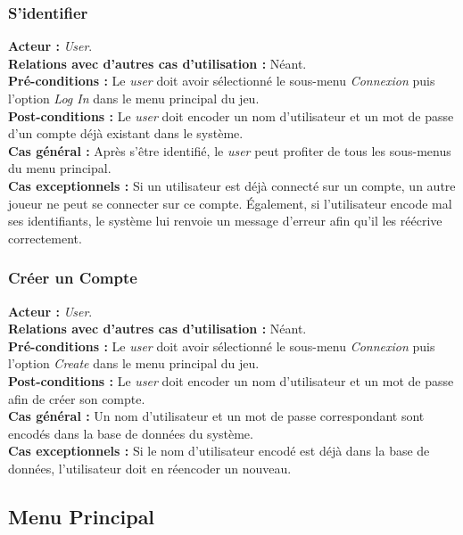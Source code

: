 \documentclass[10pt, a4paper]{article}
\begin{document}
\subsubsection{S'identifier}
\textbf{Acteur :} \textit{User}.\\
\textbf{Relations avec d'autres cas d'utilisation :} Néant.\\
\textbf{Pré-conditions :} Le \textit{user} doit avoir sélectionné le sous-menu \textit{Connexion} puis l'option {\itshape Log In} dans le menu principal du jeu.\\
\textbf{Post-conditions :} Le \textit{user} doit encoder un nom d'utilisateur et un mot de passe d'un compte déjà existant dans le système. \\
\textbf{Cas général :} Après s'être identifié, le \textit{user} peut profiter de tous les sous-menus du menu principal.\\
\textbf{Cas exceptionnels :} Si un utilisateur est déjà connecté sur un compte, un autre joueur ne peut se connecter sur ce compte. Également, si l'utilisateur encode mal ses identifiants, le système lui renvoie un message d'erreur afin qu'il les réécrive correctement.



\subsubsection{Créer un Compte}
\textbf{Acteur :} \textit{User}.\\
\textbf{Relations avec d'autres cas d'utilisation :} Néant.\\
\textbf{Pré-conditions :} Le \textit{user} doit avoir sélectionné le sous-menu \textit{Connexion} puis l'option {\itshape Create} dans le menu principal du jeu.\\
\textbf{Post-conditions :} Le \textit{user} doit encoder un nom d'utilisateur et un mot de passe afin de créer son compte.\\
\textbf{Cas général :} Un nom d'utilisateur et un mot de passe correspondant sont encodés dans la base de données du système.\\
\textbf{Cas exceptionnels :} Si le nom d'utilisateur encodé est déjà dans la base de données, l'utilisateur doit en réencoder un nouveau.



\subsection{Menu Principal}
\end{document}
